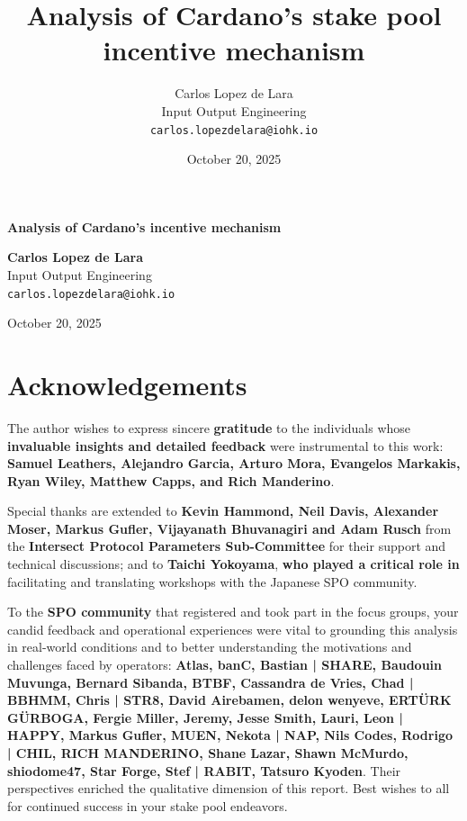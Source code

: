 \documentclass[11pt, letterpaper]{article}
\title{Analysis of Cardano's stake pool incentive mechanism}
\author{
    Carlos Lopez de Lara \\
    Input Output Engineering \\
    \texttt{carlos.lopezdelara@iohk.io}
}
\date{October 20, 2025}
\begin{document}
\begin{titlepage}
    \centering %
    
    \vfill %
    
    {\Huge \textbf{Analysis of Cardano's incentive mechanism}}
    
    \vfill 
    
    {
        \Large \textbf{Carlos Lopez de Lara} \\
        \vspace{1em} 
        \large Input Output Engineering \\
        \large \texttt{carlos.lopezdelara@iohk.io}
    }
    
    \vfill
    
    {\large October 20, 2025}
    
    \vfill 
\end{titlepage}

\thispagestyle{empty} 

\tableofcontents
\newpage
\pagestyle{fancy} 

\newpage

\section*{Acknowledgements}

The author wishes to express sincere \textbf{gratitude} to the individuals whose 
\textbf{invaluable insights and detailed feedback} were instrumental to this work: 
\textbf{Samuel Leathers, Alejandro Garcia, Arturo Mora, Evangelos Markakis, Ryan Wiley, 
Matthew Capps, and Rich Manderino}.

Special thanks are extended to \textbf{Kevin Hammond, Neil Davis, Alexander Moser, Markus Gufler, 
Vijayanath Bhuvanagiri and Adam Rusch} from the \textbf{Intersect Protocol Parameters Sub-Committee} for 
their support and technical discussions; and to \textbf{Taichi Yokoyama}, \textbf{who played a critical role in} 
facilitating and translating workshops with the Japanese SPO community.

To the \textbf{SPO community} that registered and took part in the focus groups, your candid 
feedback and operational experiences were vital to grounding this analysis in real-world conditions
and to better understanding the motivations and challenges faced by operators: \textbf{Atlas, banC, Bastian | SHARE, 
Baudouin Muvunga, Bernard Sibanda, BTBF, Cassandra de Vries, Chad | BBHMM, Chris | STR8, 
David Airebamen, delon wenyeve, ERTÜRK GÜRBOGA, Fergie Miller, Jeremy, Jesse Smith, Lauri, Leon | HAPPY, 
Markus Gufler, MUEN, Nekota | NAP, Nils Codes, Rodrigo | CHIL, RICH MANDERINO, Shane Lazar, Shawn McMurdo, 
shiodome47, Star Forge, Stef | RABIT, Tatsuro Kyoden}. Their perspectives enriched the qualitative dimension of this 
report. Best wishes to all for continued success in your stake pool endeavors.
\end{document}
